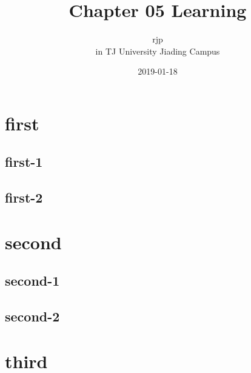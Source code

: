 \documentclass[a4paper, UTF8]{article}
\begin{document}
\title{Chapter 05 Learning}
\author{
    rjp \\[0.5cm]
    in TJ University Jiading Campus
}
\date{2019-01-18}
\maketitle

\tableofcontents
{}
\listoffigures
{}

\section{first}
\subsection{first-1}
\subsection{first-2}
\newpage

\section{second}
\subsection{second-1}
\subsection{second-2}
\newpage

\section{third}
\end{document}
